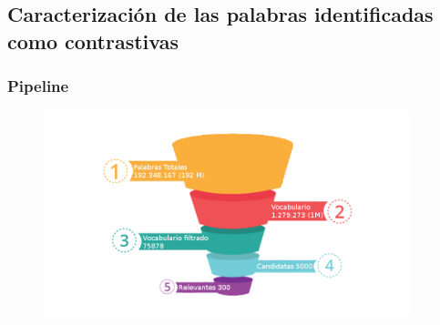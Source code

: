 \subsection{Caracterización de las palabras identificadas como contrastivas}


\begin{frame}[t]\frametitle{Pipeline}
    
\begin{figure}
  \centering
  \includegraphics[width=0.95\textwidth]{../src/images/presentacion/embudo.png}
  \label{fig:embudo}
\end{figure}

\end{frame}

